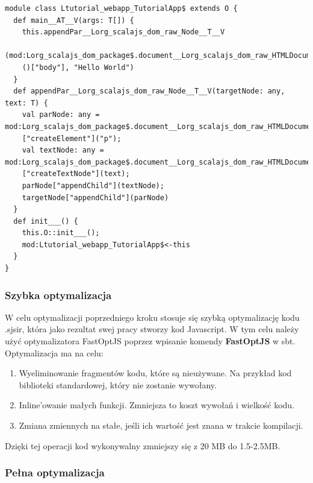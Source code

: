 \begin{minipage}{\linewidth}
\begin{lstlisting}[label={lst:scalasbt},
frame=single, numbers=none,captionpos=b, 
caption={Przykładowy plik .sjsir dla projektu wyświetlającego HelloWorld na ekranie.}]
module class Ltutorial_webapp_TutorialApp$ extends O {
  def main__AT__V(args: T[]) {
    this.appendPar__Lorg_scalajs_dom_raw_Node__T__V
    (mod:Lorg_scalajs_dom_package$.document__Lorg_scalajs_dom_raw_HTMLDocument
    ()["body"], "Hello World")
  }
  def appendPar__Lorg_scalajs_dom_raw_Node__T__V(targetNode: any, text: T) {
    val parNode: any = mod:Lorg_scalajs_dom_package$.document__Lorg_scalajs_dom_raw_HTMLDocument()
    ["createElement"]("p");
    val textNode: any = mod:Lorg_scalajs_dom_package$.document__Lorg_scalajs_dom_raw_HTMLDocument()
    ["createTextNode"](text);
    parNode["appendChild"](textNode);
    targetNode["appendChild"](parNode)
  }
  def init___() {
    this.O::init___();
    mod:Ltutorial_webapp_TutorialApp$<-this
  }
}
\end{lstlisting}
\end{minipage}
\subsubsection{Szybka optymalizacja}

W celu optymalizacji poprzedniego kroku stosuje się szybką optymalizację kodu .sjsir, która jako rezultat swej pracy stworzy kod Javascript. W tym celu należy użyć optymalizatora FastOptJS poprzez wpisanie komendy \textbf{FastOptJS} w sbt. Optymalizacja ma na celu:
\begin{enumerate}
	\item Wyeliminowanie fragmentów kodu, które są nieużywane. Na przykład kod biblioteki standardowej, który nie zostanie wywołany.
	\item Inline'owanie małych funkcji. Zmniejsza to koszt wywołań i wielkość kodu.
	\item Zmiana zmiennych na stałe, jeśli ich wartość jest znana w trakcie kompilacji.
\end{enumerate}

Dzięki tej operacji kod wykonywalny zmniejszy się z 20 MB do 1.5-2.5MB\cite{ScalaCompilationProcess}.


\subsubsection{Pełna optymalizacja}

